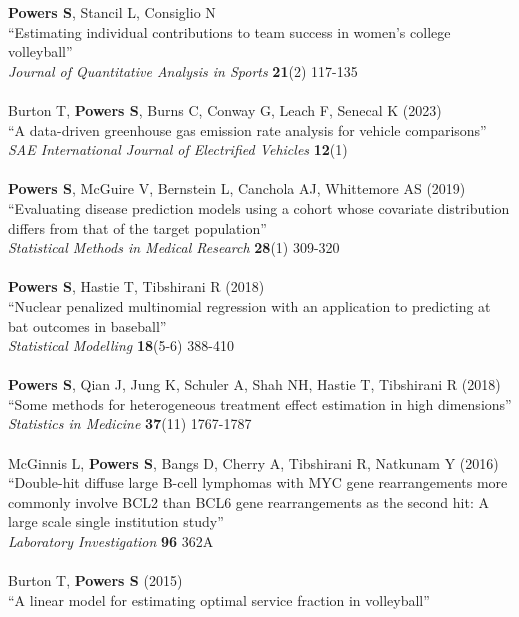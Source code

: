 \documentclass{article}
\begin{document}
{\bf Powers S}, Stancil L, Consiglio N\\
``Estimating individual contributions to team success in women's college volleyball''\\
{\it Journal of Quantitative Analysis in Sports} {\bf 21}(2) 117-135\\
~\\
Burton T, {\bf Powers S}, Burns C, Conway G, Leach F, Senecal K (2023)\\
``A data-driven greenhouse gas emission rate analysis for vehicle comparisons''\\
{\it SAE International Journal of Electrified Vehicles} {\bf 12}(1)\\
~\\
{\bf Powers S}, McGuire V, Bernstein L, Canchola AJ, Whittemore AS (2019)\\
``Evaluating disease prediction models using a cohort whose covariate distribution differs from that of the target population''\\
{\it Statistical Methods in Medical Research} {\bf 28}(1) 309-320\\
~\\
{\bf Powers S}, Hastie T, Tibshirani R (2018)\\
``Nuclear penalized multinomial regression with an application to predicting at bat outcomes in baseball''\\
{\it Statistical Modelling} {\bf 18}(5-6) 388-410\\
~\\
{\bf Powers S}, Qian J, Jung K, Schuler A, Shah NH, Hastie T, Tibshirani R (2018)\\
``Some methods for heterogeneous treatment effect estimation in high dimensions''\\
{\it Statistics in Medicine} {\bf 37}(11) 1767-1787\\
~\\
McGinnis L, {\bf Powers S}, Bangs D, Cherry A, Tibshirani R, Natkunam Y (2016)\\
``Double-hit diffuse large B-cell lymphomas with MYC gene rearrangements more commonly involve BCL2 than BCL6 gene rearrangements as the second hit: A large scale single institution study''\\
{\it Laboratory Investigation} {\bf 96} 362A\\
~\\
Burton T, {\bf Powers S} (2015)\\
``A linear model for estimating optimal service fraction in volleyball''\\
\end{document}
